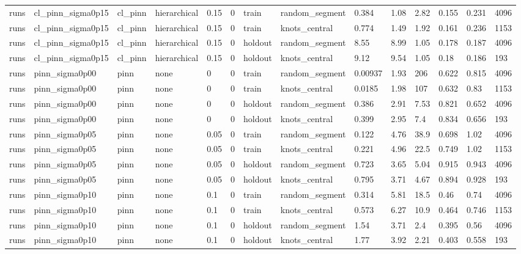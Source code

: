 \begin{table}[t]
\begin{tabular}{llllllllllllll}
runs & cl\_pinn\_sigma0p15 & cl\_pinn & hierarchical & 0.15 & 0 & train & random\_segment & 0.384 & 1.08 & 2.82 & 0.155 & 0.231 & 4096 \\
runs & cl\_pinn\_sigma0p15 & cl\_pinn & hierarchical & 0.15 & 0 & train & knots\_central & 0.774 & 1.49 & 1.92 & 0.161 & 0.236 & 1153 \\
runs & cl\_pinn\_sigma0p15 & cl\_pinn & hierarchical & 0.15 & 0 & holdout & random\_segment & 8.55 & 8.99 & 1.05 & 0.178 & 0.187 & 4096 \\
runs & cl\_pinn\_sigma0p15 & cl\_pinn & hierarchical & 0.15 & 0 & holdout & knots\_central & 9.12 & 9.54 & 1.05 & 0.18 & 0.186 & 193 \\
runs & pinn\_sigma0p00 & pinn & none & 0 & 0 & train & random\_segment & 0.00937 & 1.93 & 206 & 0.622 & 0.815 & 4096 \\
runs & pinn\_sigma0p00 & pinn & none & 0 & 0 & train & knots\_central & 0.0185 & 1.98 & 107 & 0.632 & 0.83 & 1153 \\
runs & pinn\_sigma0p00 & pinn & none & 0 & 0 & holdout & random\_segment & 0.386 & 2.91 & 7.53 & 0.821 & 0.652 & 4096 \\
runs & pinn\_sigma0p00 & pinn & none & 0 & 0 & holdout & knots\_central & 0.399 & 2.95 & 7.4 & 0.834 & 0.656 & 193 \\
runs & pinn\_sigma0p05 & pinn & none & 0.05 & 0 & train & random\_segment & 0.122 & 4.76 & 38.9 & 0.698 & 1.02 & 4096 \\
runs & pinn\_sigma0p05 & pinn & none & 0.05 & 0 & train & knots\_central & 0.221 & 4.96 & 22.5 & 0.749 & 1.02 & 1153 \\
runs & pinn\_sigma0p05 & pinn & none & 0.05 & 0 & holdout & random\_segment & 0.723 & 3.65 & 5.04 & 0.915 & 0.943 & 4096 \\
runs & pinn\_sigma0p05 & pinn & none & 0.05 & 0 & holdout & knots\_central & 0.795 & 3.71 & 4.67 & 0.894 & 0.928 & 193 \\
runs & pinn\_sigma0p10 & pinn & none & 0.1 & 0 & train & random\_segment & 0.314 & 5.81 & 18.5 & 0.46 & 0.74 & 4096 \\
runs & pinn\_sigma0p10 & pinn & none & 0.1 & 0 & train & knots\_central & 0.573 & 6.27 & 10.9 & 0.464 & 0.746 & 1153 \\
runs & pinn\_sigma0p10 & pinn & none & 0.1 & 0 & holdout & random\_segment & 1.54 & 3.71 & 2.4 & 0.395 & 0.56 & 4096 \\
runs & pinn\_sigma0p10 & pinn & none & 0.1 & 0 & holdout & knots\_central & 1.77 & 3.92 & 2.21 & 0.403 & 0.558 & 193 \\

\end{tabular}
\end{table}
